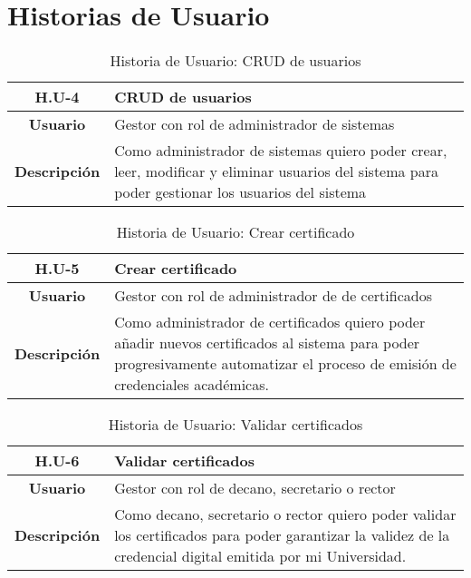 \chapter{Historias de Usuario}\label{appendix:useHistory}
\begin{table}[!h]
	\begin{center}
		\begin{tabular}{|c|p{10cm}|}
			\hline \textbf{H.U-4} & CRUD de usuarios \\ 
			\hline \textbf{Usuario} & Gestor con rol de administrador de sistemas \\ 
			\hline \textbf{Descripci\'on} & Como administrador de sistemas quiero poder crear, leer, modificar y eliminar usuarios del sistema para poder gestionar los usuarios del sistema \\ 
			\hline 
		\end{tabular}
		\caption{Historia de Usuario: CRUD de usuarios}
		\label{tab:HU4}
	\end{center}
\end{table}

\begin{table}[!h]
	\begin{center}
		\begin{tabular}{|c|p{10cm}|}
			\hline \textbf{H.U-5} & Crear certificado \\ 
			\hline \textbf{Usuario} & Gestor con rol de administrador de de certificados \\ 
			\hline \textbf{Descripci\'on} & Como administrador de certificados quiero poder a\~nadir nuevos certificados al sistema para poder progresivamente automatizar el proceso de emisi\'on de credenciales acad\'emicas. \\ 
			\hline 
		\end{tabular}
		\caption{Historia de Usuario: Crear certificado}
		\label{tab:HU5}
	\end{center}
\end{table}

\begin{table}[!h]
	\begin{center}
		\begin{tabular}{|c|p{10cm}|}
			\hline \textbf{H.U-6} & Validar certificados \\ 
			\hline \textbf{Usuario} & Gestor con rol de decano, secretario o rector \\ 
			\hline \textbf{Descripci\'on} & Como decano, secretario o rector quiero poder validar los certificados para poder garantizar la validez de la credencial digital emitida por mi Universidad. \\ 
			\hline 
		\end{tabular}
		\caption{Historia de Usuario: Validar certificados}
		\label{tab:HU6}
	\end{center}
\end{table}

